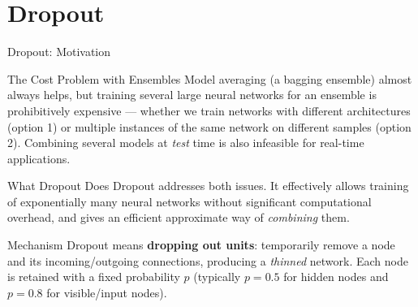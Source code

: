 \documentclass{beamer}
\begin{document}
\section{Dropout}

\begin{frame}[shrink=10]{Dropout: Motivation}
  \begin{block}{The Cost Problem with Ensembles}
    Model averaging (a bagging ensemble) almost always helps, but training
    several large neural networks for an ensemble is prohibitively
    expensive --- whether we train networks with different architectures
    (option 1) or multiple instances of the same network on different
    samples (option 2). Combining several models at \emph{test} time is
    also infeasible for real-time applications.
  \end{block}

  \begin{block}{What Dropout Does}
    Dropout addresses both issues. It effectively allows training of
    exponentially many neural networks without significant computational
    overhead, and gives an efficient approximate way of \emph{combining}
    them.
  \end{block}

  \begin{exampleblock}{Mechanism}
    Dropout means \textbf{dropping out units}: temporarily remove a node
    and its incoming/outgoing connections, producing a \emph{thinned}
    network. Each node is retained with a fixed probability $p$ (typically
    $p = 0.5$ for hidden nodes and $p = 0.8$ for visible/input nodes).
  \end{exampleblock}
\end{frame}
\end{document}
